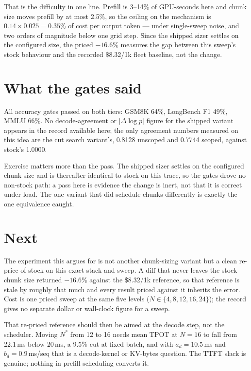 \documentclass[10pt,twocolumn]{article}
\begin{document}
That is the difficulty in one line.  Prefill is 3--14\% of GPU-seconds here and
chunk size moves prefill by at most 2.5\%, so the ceiling on the mechanism is
$0.14 \times 0.025 = 0.35$\% of cost per output token --- under single-sweep
noise, and two orders of magnitude below one grid step.  Since the shipped sizer
settles on the configured size, the priced $-16.6$\% measures the gap between
this sweep's stock behaviour and the recorded \$8.32/1k fleet baseline, not the
change.

\section{What the gates said}
All accuracy gates passed on both tiers: GSM8K 64\%, LongBench F1 49\%, MMLU
66\%.  No decode-agreement or $|\Delta\log p|$ figure for the shipped variant
appears in the record available here; the only agreement numbers measured on
this idea are the cut search variant's, 0.8128 unscoped and 0.7744 scoped,
against stock's 1.0000.

Exercise matters more than the pass.  The shipped sizer settles on the
configured chunk size and is thereafter identical to stock on this trace, so the
gates drove no non-stock path: a pass here is evidence the change is inert, not
that it is correct under load.  The one variant that did schedule chunks
differently is exactly the one equivalence caught.

\section{Next}
The experiment this argues for is not another chunk-sizing variant but a clean
re-price of stock on this exact stack and sweep.  A diff that never leaves the
stock chunk size returned $-16.6$\% against the \$8.32/1k reference, so that
reference is stale by roughly that much and every result priced against it
inherits the error.  Cost is one priced sweep at the same five levels
($N \in \{4,8,12,16,24\}$); the record gives no separate dollar or wall-clock
figure for a sweep.

That re-priced reference should then be aimed at the decode step, not the
scheduler.  Moving $N^{*}$ from 12 to 16 needs mean TPOT at $N{=}16$ to fall
from 22.1\,ms below 20\,ms, a 9.5\% cut at fixed batch, and with
$a_d = 10.5$\,ms and $b_d = 0.9$\,ms/seq that is a decode-kernel or KV-bytes
question.  The TTFT slack is genuine; nothing in prefill scheduling converts it.
\end{document}
